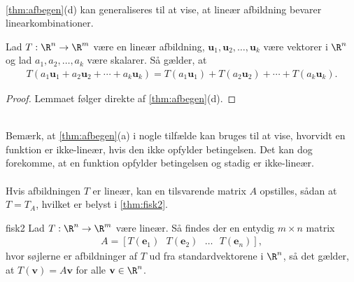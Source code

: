 %
\\
\ref{thm:afbegen}(d) kan generaliseres til at vise, at lineær afbildning bevarer linearkombinationer.
\begin{lem}{}{}
Lad $T:\R^n \rightarrow \R^m$ være en lineær afbildning, $\textbf{u}_1,\textbf{u}_2,\ldots,\textbf{u}_k$ være vektorer i $\R^n$ og lad $a_1,a_2,\ldots,a_k$ være skalarer. 
Så gælder, at
%
\begin{align*}
T(a_1\textbf{u}_1 + a_2\textbf{u}_2 + \cdots + a_k\textbf{u}_k) = T(a_1\textbf{u}_1) + T(a_2\textbf{u}_2) + \cdots + T(a_k\textbf{u}_k).
\end{align*}
%
\end{lem}
%
\begin{proof}
Lemmaet følger direkte af \ref{thm:afbegen}(d).
\end{proof}
\\
%
Bemærk, at \ref{thm:afbegen}(a) i nogle tilfælde kan bruges til at vise, hvorvidt en funktion er ikke-lineær, hvis den ikke opfylder betingelsen. 
Det kan dog forekomme, at en funktion opfylder betingelsen og stadig er ikke-lineær.
% 
\\\\
% 
Hvis afbildningen $T$ er lineær, kan en tilsvarende matrix $A$ opstilles, sådan at $T=T_A$, hvilket er belyst i \ref{thm:fisk2}.
%
% 
\begin{thm}{}{fisk2}
Lad $T: \R^n \rightarrow \R^m$ være lineær. 
Så findes der en entydig $m \times n$ matrix
\begin{align*}
A= [T(\mathbf{e}_1)\text{    } T(\mathbf{e}_2) \text{    } \ldots \text{    } T(\mathbf{e}_n)],
\end{align*}
hvor søjlerne er afbildninger af $T$ ud fra standardvektorene i $\R^n$, så det gælder, at $T(\mathbf{v})=A \mathbf{v}$ for alle $\mathbf{v} \in \R^n$.
\end{thm}
%
%

